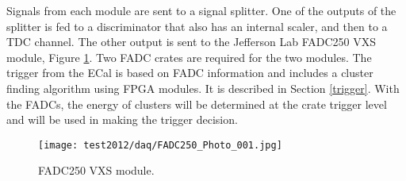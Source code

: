 
Signals from each module are sent to a signal splitter. One of the outputs of the splitter is fed to a discriminator that also has an internal scaler, and then to a TDC channel. The other output is sent to the Jefferson Lab FADC250 VXS module, Figure \ref{fig:testrun_fadc}. Two FADC crates are required for the  two modules. The trigger from the ECal is based on FADC information and includes a cluster finding algorithm using FPGA modules. It is described in Section \ref{trigger}. With the FADCs, the energy of clusters will be determined at the crate trigger level and will be used in making the trigger decision.

\begin{figure}[t]
\texttt{[image: test2012/daq/FADC250\_Photo\_001.jpg]}
\caption{\small{FADC250 VXS module.}}\label{fig:testrun_fadc}
\end{figure}

